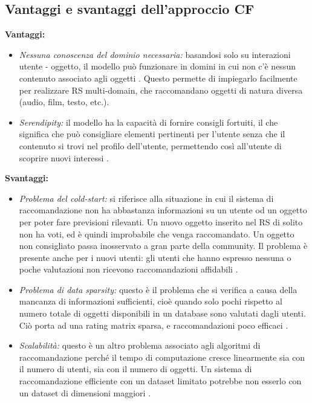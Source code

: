 \documentclass[12pt,italian]{report}
\begin{document}
\subsection{Vantaggi e svantaggi dell'approccio CF} \label{ssec:pros-cons-cf}
\textbf{Vantaggi:}
\begin{itemize}

 \item \textit{Nessuna conoscenza del dominio necessaria:} basandosi solo su interazioni utente - oggetto, il modello può funzionare in domini in cui non c'è nessun contenuto associato agli oggetti \cite{recsys-principle-methods-evaluation}. Questo permette di impiegarlo facilmente per realizzare RS multi-domain, che raccomandano oggetti di natura diversa (audio, film, testo, etc.).
 
 \item \textit{Serendipity:} il modello ha la capacità di fornire consigli fortuiti, il che significa che può consigliare elementi pertinenti per l'utente senza che il contenuto si trovi nel profilo dell'utente, permettendo così all'utente di scoprire nuovi interessi \cite{recsys-principle-methods-evaluation} \cite{cf-advantages-google}.
\end{itemize}

\noindent \textbf{Svantaggi:}
\begin{itemize}
 \item \textit{Problema del cold-start:} si riferisce alla situazione in cui il sistema di raccomandazione non ha abbastanza informazioni su un utente od un oggetto per poter fare previsioni rilevanti. Un nuovo oggetto inserito nel RS di solito non ha voti, ed è quindi improbabile che venga raccomandato. Un oggetto non consigliato passa inosservato a gran parte della community. Il problema è presente anche per i nuovi utenti: gli utenti che hanno espresso nessuna o poche valutazioni non ricevono raccomandazioni affidabili \cite{cold-start}.   
 
 \item  \textit{Problema di data sparsity:} questo è il problema che si verifica a causa della mancanza di informazioni sufficienti, cioè quando solo pochi rispetto al numero totale di oggetti disponibili in un database sono valutati dagli utenti. Ciò porta ad una rating matrix sparsa, e raccomandazioni poco efficaci \cite{recsys-principle-methods-evaluation}.
 
 \item \textit{Scalabilità:} questo è un altro problema associato agli algoritmi di raccomandazione perché il tempo di computazione cresce linearmente sia con il numero di utenti, sia con il numero di oggetti. Un sistema di raccomandazione efficiente con un dataset limitato potrebbe non esserlo con un dataset di dimensioni maggiori \cite{recsys-principle-methods-evaluation}.
\end{itemize}
\end{document}
